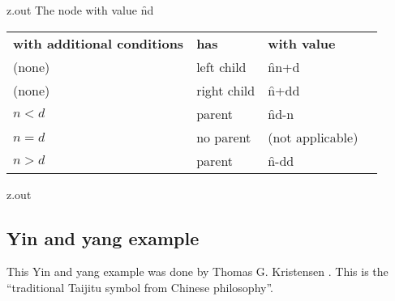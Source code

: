\MyIO


\begin{VerbatimOut}{z.out}
The node with value \f nd
\begin{inlinetable}
  \begin{tabular}{@{}llll@{}}
    \bfseries with additional conditions& \bfseries has& \bfseries with value\\
    \noalign{\vspace{2pt}}
    (none)&                     left child&     \f n{{n+d}}\\
    \noalign{\vspace{12pt}}
    (none)&                     right child&    \f {{n+d}}d\\
    \noalign{\vspace{12pt}}
    $n<d$&                      parent&         \f n{{d-n}}\\
    \noalign{\vspace{12pt}}
    $n=d$&                      no parent&      (not applicable)\\
    \noalign{\vspace{12pt}}
    $n>d$&                      parent&         \f {{n-d}}d\\
  \end{tabular}
\end{inlinetable}
\end{VerbatimOut}

\MyIO


\begin{VerbatimOut}{z.out}


\subsection{Yin and yang example}

This Yin and yang example was done by Thomas G. Kristensen \cite{kristensen}.
This is the ``traditional Taijitu symbol from Chinese philosophy''.

\end{VerbatimOut}

